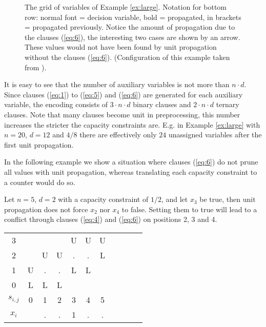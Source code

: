 \documentclass[]{llncs}
\begin{document}
\begin{figure}
\centering 
\caption{The grid of variables of Example \ref{ex:large}. Notation for bottom row: normal font = decision variable, bold
    = propagated, in brackets = propagated previously. Notice the amount of propagation due to the clauses (\ref{eq:6}),
    the interesting two cases are shown by an arrow. These values would not have been found by unit propagation without
    the clauses (\ref{eq:6}). (Configuration of this example taken from
\cite{Siala12}).}


\label{fig3}
\end{figure}

It is easy to see that the number of auxiliary variables is not more than $n\cdot d$. Since clauses (\ref{eq:1}) to
(\ref{eq:5}) and (\ref{eq:6}) are generated for each auxiliary variable, the encoding consists of $3\cdot n \cdot d$
binary clauses and $2 \cdot n \cdot d$ ternary clauses. Note that many clauses become unit in preprocessing, this number
increases the stricter the capacity constraints are. E.g. in Example \ref{ex:large} with $n=20$, $d=12$ and $4/8$ there are
effectively only $24$ unassigned variables after the first unit propagation. 

In the following example we show a situation where clauses (\ref{eq:6}) do not prune all values with unit propagation,
whereas translating each capacity constraint to a counter would do so. 

\begin{example}\label{ex:small}
 \begin{minipage}[c]{.58\linewidth} Let $n=5$, $d=2$ with a capacity constraint of $1/2$, and let $x_3$ be true, then
     unit propagation does not force $x_2$ nor $x_4$ to false. Setting them to true will lead to a conflict through
     clauses (\ref{eq:4}) and (\ref{eq:6}) on positions 2, 3 and 4.
   \end{minipage} \hfill
   \begin{minipage}[c]{.36\linewidth}
\begin{center}
\begin{small}
\begin{tabular}{c|cccccccccc}
3   &   &   &   &U  &U  &U  \\
2   &   &U  &U  &.  &.  &L  \\
1   &U  &.  &.  &L  &L  &   \\
0   &L  &L  &L  &   &   &   \\
\hline
$s_{i,j}$ &0  &1  &2  &3  &4  &5 \\
$x_i$     &  &.  &.  &1  &.  &.  \\
\end{tabular}
\end{small} 
\end{center}     
   \end{minipage}
\end{example}
\end{document}
